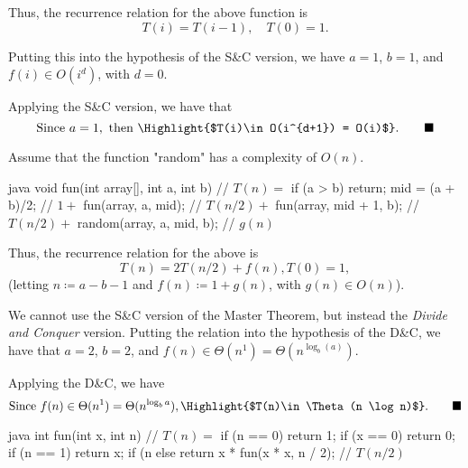 \documentclass[12pt, a4paper]{article}
\newcommand{\QED}{\tag*{$\blacksquare$}}
\begin{document}
Thus, the recurrence relation for the above function is
\begin{equation*}
  T(i) = T(i-1), \quad T(0) = 1.
\end{equation*}

Putting this into the hypothesis of the S\&C version,
we have $a=1$, $b=1$, and $f(i)\in O(i^d)$, with $d=0$.

Applying the S\&C version, we have that
\begin{equation*}
  \textrm{Since}\ a = 1,\ \textrm{then}\ \Highlight{$T(i)\in O(i^{d+1}) = O(i)$}. \QED
\end{equation*}



\newpage



Assume that the function "random" has a complexity of $O(n)$.
\begin{MintedUnbreakableCodeBlock}{java}
      void fun(int array[], int a, int b) { // $T(n)=$
        if (a > b) return;
        mid = (a + b)/2;                    // $1+$
        fun(array, a, mid);                 // $T(n/2)+$
        fun(array, mid + 1, b);             // $T(n/2)+$
        random(array, a, mid, b);           // $g(n)$
      }
\end{MintedUnbreakableCodeBlock}

Thus, the recurrence relation for the above is
\begin{equation*}
  T(n) = 2T(n/2) + f(n), T(0) = 1,
\end{equation*}
(letting $n \coloneqq a-b-1$ and $f(n) \coloneqq 1+g(n)$, with $g(n)\in O(n)$).

We cannot use the S\&C version of the Master Theorem,
but instead the \textit{Divide and Conquer} version.
Putting the relation into the hypothesis of the D\&C,
we have that $a=2$, $b=2$, and $f(n)\in\Theta(n^1) = \Theta(n^{\log_b(a)})$.

Applying the D\&C, we have
\begin{equation*}
  \textrm{Since}\ f(n)\in\Theta(n^1) = \Theta(n^{\log_ba}), \Highlight{$T(n)\in\Theta(n \log n)$}. \QED
\end{equation*}



\newpage



\begin{MintedUnbreakableCodeBlock}{java}
      int fun(int x, int n) {                     // $T(n)=$
        if (n == 0) return 1;
        if (x == 0) return 0;
        if (n == 1) return x;
        if (n %
        else return x * fun(x * x, n / 2);        // $T(n/2)$
      }
\end{MintedUnbreakableCodeBlock}
\end{document}
